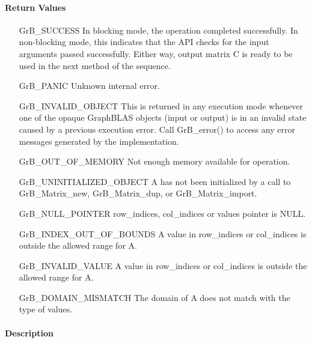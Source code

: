 \paragraph{Return Values}

\begin{itemize}[leftmargin=2.3in]
    \item[{\sf GrB\_SUCCESS}]         In blocking mode, the operation completed
    successfully. In non-blocking mode, this indicates that the API checks 
    for the input arguments passed successfully. Either way, output matrix 
    {\sf C} is ready to be used in the next method of the sequence.

    \item[{\sf GrB\_PANIC}]           Unknown internal error.
    
    \item[{\sf GrB\_INVALID\_OBJECT}] This is returned in any execution mode 
    whenever one of the opaque GraphBLAS objects (input or output) is in an invalid 
    state caused by a previous execution error.  Call {\sf GrB\_error()} to access 
    any error messages generated by the implementation.

    \item[{\sf GrB\_OUT\_OF\_MEMORY}] Not enough memory available for operation.
    
    \item[{\sf GrB\_UNINITIALIZED\_OBJECT}]  {\sf A} has not been 
    initialized by a call to {\sf GrB\_Matrix\_new},
    {\sf GrB\_Matrix\_dup}, or {\sf GrB\_Matrix\_import}.
    
    \item[{\sf GrB\_NULL\_POINTER}]  {\sf row\_indices}, 
    {\sf col\_indices} or {\sf values} pointer is {\sf NULL}.

    \item[{\sf GrB\_INDEX\_OUT\_OF\_BOUNDS}] A value in {\sf row\_indices} or
    {\sf col\_indices} is outside the allowed range for {\sf A}.

    \item[{\sf GrB\_INVALID\_VALUE}] A value in {\sf row\_indices} or
    {\sf col\_indices} is outside the allowed range for {\sf A}.

  \item[{\sf GrB\_DOMAIN\_MISMATCH}]    The domain of {\sf A} does not match
    with the type of {\sf values}.
\end{itemize}

\paragraph{Description}


